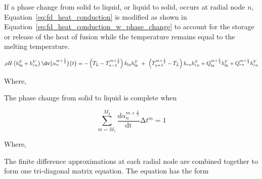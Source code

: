 If a phase change from solid to liquid, or liquid to solid, occurs at radial node \(n\),
Equation~\ref{eq:fd_heat_conduction} is modified as shown in
Equation~\ref{eq:fd_heat_conduction_w_phase_change} to account for the storage or release of the
heat of fusion while the temperature remains equal to the melting temperature.

\begin{equation}
    \label{eq:fd_heat_conduction_w_phase_change}
    \rho H\left( h_{\ln}^{V} + h_{rn}^{V} \right)\dv{\alpha_{n}^{m + \frac{1}{2}}}{t} =
   -\left( T_{L} - T_{n - 1}^{m + \frac{1}{2}} \right)k_{\ln}h_{\ln}^{S}\  + \ \left( T_{n + 1}^{m + \frac{1}{2}} - T_{L} \right)k_{rn}h_{rn}^{S} + Q_{\ln}^{m + \frac{1}{2}}h_{\ln}^{V} + Q_{rn}^{m + \frac{1}{2}}h_{rn}^{V}
\end{equation}

Where,

The phase change from solid to liquid is complete when

\begin{equation}
    \label{eq:phase_change_complete}
    \sum_{m = M_{1}}^{M_{2}}{\frac{d\alpha_{n}^{m + \frac{1}{2}}}{\text{dt}}\mathrm{\Delta}t^{m}} = 1
\end{equation}

Where,

The finite difference approximations at each radial node are combined together to form one
tri-diagonal matrix equation. The equation has the form

